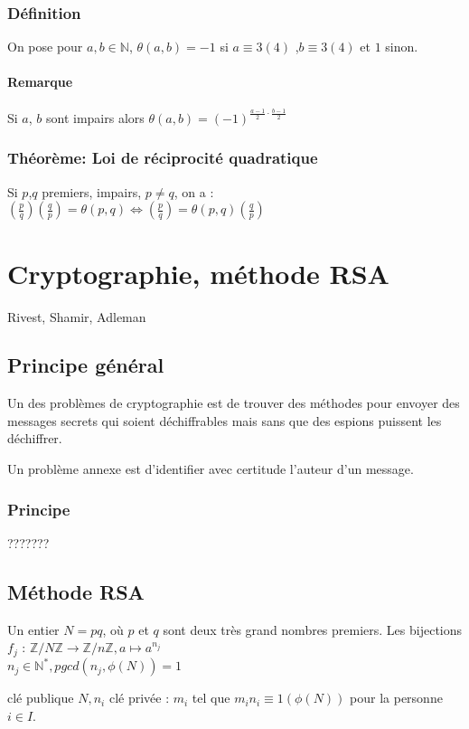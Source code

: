 \documentclass[a4paper,10pt]{book} %
\newcommand{\N}{\mathbb{N}}
\newcommand{\Z}{\mathbb{Z}}
\begin{document}
\subsection{Définition}
On pose pour $a,b \in \N$, $\theta (a,b) = -1$ si $a\equiv 3(4)$ ,$b\equiv 3(4)$ et $1$ sinon. \\
\subsubsection{Remarque}
Si $a$, $b$ sont impairs alors $\theta (a,b)=(-1)^{\frac{a-1}{2}\cdot\frac{b-1}{2}}$\\
\subsection{Théorème: Loi de réciprocité quadratique}
Si $p$,$q$ premiers, impairs, $p\neq q$, on a : $(\frac{p}{q})(\frac{q}{p}) = \theta (p,q) \Leftrightarrow (\frac{p}{q}) = \theta (p,q)(\frac{q}{p})$\\

\chapter{Cryptographie, méthode RSA}
Rivest, Shamir, Adleman
\section{Principe général}
Un des problèmes de cryptographie est de trouver des méthodes pour envoyer des messages secrets qui soient déchiffrables mais sans que des espions puissent les déchiffrer.

Un problème annexe est d'identifier avec certitude l'auteur d'un message.

\subsection{Principe}

???????

\section{Méthode RSA}
Un entier $N=pq$, où $p$ et $q$ sont deux très grand nombres premiers.
Les bijections $f_j$ : $\Z/N\Z \rightarrow \Z/n\Z, a\mapsto a^{n_j}$\\
$n_j\in \N^*, pgcd(n_j,\phi(N))=1$

clé publique $N,n_i$
clé privée : $m_i$ tel que $m_in_i\equiv 1(\phi(N))$ pour la personne $i\in I$.
\end{document}
